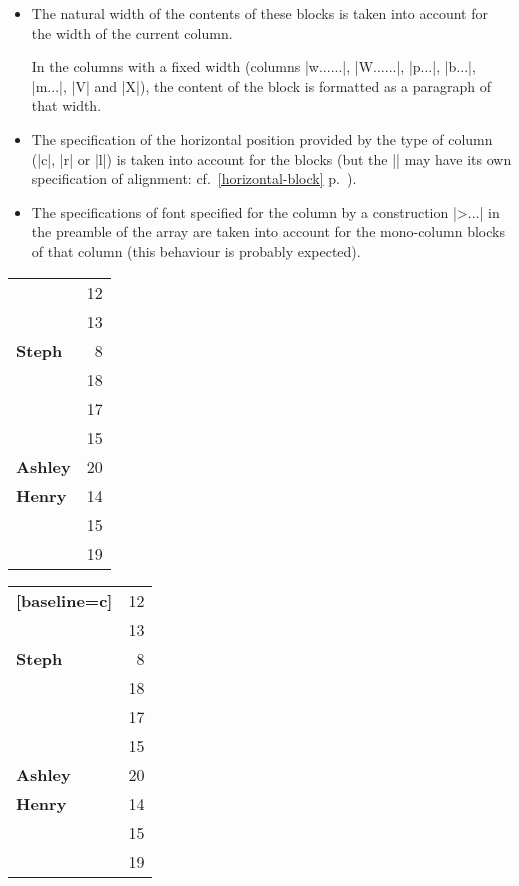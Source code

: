 \documentclass[dvipsnames]{article}%
\begin{document}
\begin{itemize}
\item The natural width of the contents of these blocks is taken into account
for the width of the current column.

In the columns with a fixed width (columns |w{...}{...}|, |W{...}{...}|,
|p{...}|, |b{...}|, |m{...}|, |V| and |X|), the content of the block is
formatted as a paragraph of that width.

\item The specification of the horizontal position provided by the type of
column (|c|, |r| or |l|) is taken into account for the blocks (but the
|\Block| may have its own specification of alignment:
cf.~\ref{horizontal-block} p.~\pageref{horizontal-block}).

\item The specifications of font specified for the column by a construction
|>{...}| in the preamble of the array are taken into account for the
mono-column blocks of that column (this behaviour is probably expected).
\end{itemize}


\bigskip
\begin{scope}
\hfuzz=10cm
\begin{Code}[width=12cm]
\begin{NiceTabular}{@{}>{\bfseries}lr@{}} \hline
{}    & 12 \\
                     & 13 \\ \hline
Steph                &  8 \\ \hline
{}   & 18 \\
                     & 17 \\
                     & 15 \\ \hline
Ashley               & 20 \\ \hline
Henry                & 14 \\ \hline
{} & 15 \\
                     & 19 \\ \hline
\end{NiceTabular}
\end{Code}
\begin{NiceTabular}{@{}>{\bfseries}lr@{}}[baseline=c] \hline
{}    & 12 \\
                     & 13 \\ \hline
Steph                &  8 \\ \hline
{}   & 18 \\
                     & 17 \\
                     & 15 \\ \hline
Ashley               & 20 \\ \hline
Henry                & 14 \\ \hline
{} & 15 \\
                     & 19 \\ \hline
\end{NiceTabular}
\end{scope}
\end{document}

